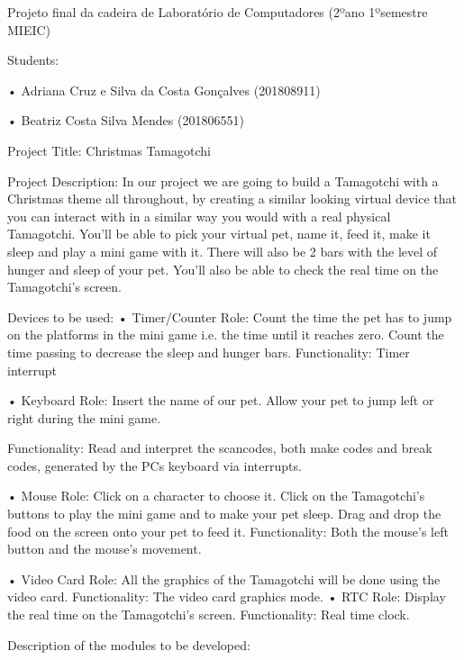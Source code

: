 Projeto final da cadeira de Laboratório de Computadores (2ºano 1ºsemestre M\+I\+E\+IC)

Students\+:

• Adriana Cruz e Silva da Costa Gonçalves (201808911)

• Beatriz Costa Silva Mendes (201806551)

Project Title\+: Christmas Tamagotchi

Project Description\+: In our project we are going to build a Tamagotchi with a Christmas theme all throughout, by creating a similar looking virtual device that you can interact with in a similar way you would with a real physical Tamagotchi. You’ll be able to pick your virtual pet, name it, feed it, make it sleep and play a mini game with it. There will also be 2 bars with the level of hunger and sleep of your pet. You’ll also be able to check the real time on the Tamagotchi’s screen.

Devices to be used\+: • Timer/\+Counter Role\+: Count the time the pet has to jump on the platforms in the mini game i.\+e. the time until it reaches zero. Count the time passing to decrease the sleep and hunger bars. Functionality\+: Timer interrupt

• Keyboard Role\+: Insert the name of our pet. Allow your pet to jump left or right during the mini game.

Functionality\+: Read and interpret the scancodes, both make codes and break codes, generated by the PC\textquotesingle{}s keyboard via interrupts.

• Mouse Role\+: Click on a character to choose it. Click on the Tamagotchi’s buttons to play the mini game and to make your pet sleep. Drag and drop the food on the screen onto your pet to feed it. Functionality\+: Both the mouse’s left button and the mouse’s movement.

• Video Card Role\+: All the graphics of the Tamagotchi will be done using the video card. Functionality\+: The video card graphics mode. • R\+TC Role\+: Display the real time on the Tamagotchi’s screen. Functionality\+: Real time clock.

Description of the modules to be developed\+:

